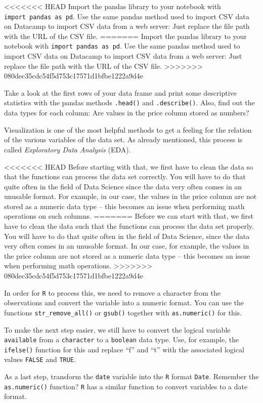 \documentclass[
  11pt,
]{article}
\newenvironment{tips}[1]
  {
  \begin{itemize}
  \footnotesize
  \renewcommand{\labelitemi}{
    \raisebox{-.7\height}[0pt][0pt]{
      {\setkeys{Gin}{width=3em,keepaspectratio}
        \texttt{[image: images/\#1.png]}}
    }
  }
  \setlength{\fboxsep}{1em}
  \begin{rbox}
  \item
  }
  {
  \end{rbox}
  \end{itemize}
  }
\newenvironment{tipsp}[1]
  {
  \begin{itemize}
  \footnotesize
  \renewcommand{\labelitemi}{
    \raisebox{-.7\height}[0pt][0pt]{
      {\setkeys{Gin}{width=3em,keepaspectratio}
        \texttt{[image: images/\#1.png]}}
    }
  }
  \setlength{\fboxsep}{1em}
  \begin{pbox}
  \item
  }
  {
  \end{pbox}
  \end{itemize}
  }
\begin{document}
\begin{tipsp}p
<<<<<<< HEAD
Import the pandas library to your notebook with \texttt{import\ pandas\ as\ pd}.
Use the same pandas method used to import CSV data on Datacamp to import CSV data from a web server: Just replace the file path with the URL of the CSV file.
=======
Import the pandas library to your notebook with \texttt{import\ pandas\ as\ pd}. Use the same pandas method used to import CSV data on Datacamp to import CSV data from a web server: Just replace the file path with the URL of the CSV file.
>>>>>>> 080dec35cdc54f5d753c17571d1bfbe1222a9d4e

Take a look at the first rows of your data frame and print some descriptive statistics with the pandas methods \texttt{.head()} and \texttt{.describe()}.
Also, find out the data types for each column: Are values in the price column stored as numbers?

\end{tipsp}

Visualization is one of the most helpful methods to get a feeling for the relation of the various variables of the data set.
As already mentioned, this process is called \emph{Exploratory Data Analysis} (EDA).

<<<<<<< HEAD
Before starting with that, we first have to clean the data so that the functions can process the data set correctly.
You will have to do that quite often in the field of Data Science since the data very often comes in an unusable format.
For example, in our case, the values in the price column are not stored as a numeric data type -- this becomes an issue when performing math operations on such columns.
=======
Before we can start with that, we first have to clean the data such that the functions can process the data set properly. You will have to do that quite often in the field of Data Science, since the data very often comes in an unusable format. In our case, for example, the values in the price column are not stored as a numeric data type -- this becomes an issue when performing math operations.
>>>>>>> 080dec35cdc54f5d753c17571d1bfbe1222a9d4e

\begin{tips}r
In order for \texttt{R} to process this, we need to remove a character from the observations and convert the variable into a numeric format.
You can use the functions \texttt{str\_remove\_all()} or \texttt{gsub()} together with \texttt{as.numeric()} for this.

To make the next step easier, we still have to convert the logical variable \texttt{available} from a \texttt{character} to a \texttt{boolean} data type.
Use, for example, the \texttt{ifelse()} function for this and replace ``f'' and ``t'' with the associated logical values \texttt{FALSE} and \texttt{TRUE}.

As a last step, transform the \texttt{date} variable into the \texttt{R} format \texttt{Date}.
Remember the \texttt{as.numeric()} function?
\texttt{R} has a similar function to convert variables to a date format.

\end{tips}
\end{document}
